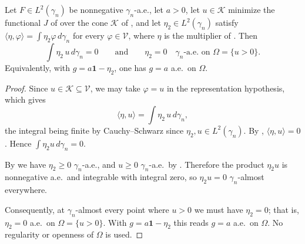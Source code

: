 \begin{lemma}
Let $F \in L^2(\gamma_n)$ be nonnegative $\gamma_n$-a.e., let $a > 0$, let
$u \in \mathcal{K}$ minimize the functional $J$ of 
over the cone $\mathcal{K}$ of , and let
$\eta_2 \in L^2(\gamma_n)$ satisfy
$\langle\eta,\varphi\rangle = \int \eta_2\varphi\,d\gamma_n$ for every
$\varphi \in \mathcal{V}$, where $\eta$ is the multiplier of
.  Then
\[
  \int \eta_2\, u \, d\gamma_n = 0
  \qquad\text{and}\qquad
  \eta_2 = 0 \quad \gamma_n\text{-a.e. on } \Omega = \{u > 0\} .
\]
Equivalently, with $g = a\mathbf{1} - \eta_2$, one has $g = a$ a.e.\ on $\Omega$.
\end{lemma}
\begin{proof}
Since $u \in \mathcal{K} \subseteq \mathcal{V}$, we may take $\varphi = u$ in the
representation hypothesis, which gives
\[
  \langle \eta, u\rangle = \int \eta_2\, u \, d\gamma_n ,
\]
the integral being finite by Cauchy--Schwarz since
$\eta_2, u \in L^2(\gamma_n)$.  By ,
$\langle\eta,u\rangle = 0$.  Hence $\int \eta_2 u \, d\gamma_n = 0$.

By  we have $\eta_2 \geq 0$ $\gamma_n$-a.e.,
and $u \geq 0$ $\gamma_n$-a.e.\ by .  Therefore the product
$\eta_2 u$ is nonnegative a.e.\ and integrable with integral zero, so
$\eta_2 u = 0$ $\gamma_n$-almost everywhere.

Consequently, at $\gamma_n$-almost every point where $u > 0$ we must have
$\eta_2 = 0$; that is, $\eta_2 = 0$ a.e.\ on $\Omega = \{u>0\}$.  With
$g = a\mathbf{1} - \eta_2$ this reads $g = a$ a.e.\ on $\Omega$.  No regularity or
openness of $\Omega$ is used.
\end{proof}
